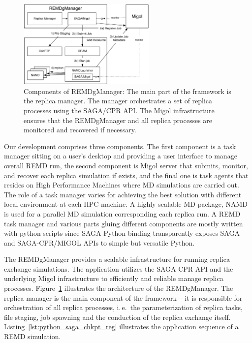 \documentclass[times, 10pt,twocolumn]{article}
\begin{document}
\begin{figure}[htbp]
      \centering
          \includegraphics[width=0.6\textwidth]{REMDgManager-architecture.pdf}
      \caption{Components of REMDgManager: The main part of the framework is the replica manager. The manager orchestrates a set of replica processes using the SAGA/CPR API. The Migol infrastructure ensures that the REMDgManager and all replica processes are monitored and recovered if necessary.}
      \label{fig:REMDgManager-architecture}
\end{figure}



Our development comprises three components. The first component is a
task manager sitting on a user's desktop and providing a user
interface to manage overall REMD run, the second component is Migol
server that submits, monitor, and recover each replica simulation if
exists, and the final one is task agents that resides on High
Performance Machines where MD simulations are carried out.  The role
of a task manager varies for achieving the best solution with
different local environment at each HPC machine.  A highly scalable MD
package, NAMD~\cite{Phillips:2005gd} is used for a parallel MD
simulation corresponding each replica run.  A REMD task manager and
various parts gluing different components are mostly written with
python scripts since SAGA-Python binding transparently exposes SAGA
and SAGA-CPR/MIGOL APIs to simple but versatile Python.

The REMDgManager provides a scalable infrastructure for running
replica exchange simulations.  The application utilizes the SAGA CPR
API and the underlying Migol infrastructure to efficiently and
reliable manage replica
processes. Figure~\ref{fig:REMDgManager-architecture} illustrates the
architecture of the REMDgManager. The replica manager is the main
component of the framework -- it is responsible for orchestration of
all replica processes, i.\,e.\ the parameterization of replica tasks,
file staging, job spawning and the conduction of the replica exchange
itself. Listing~\ref{lst:python_saga_chkpt_reg} illustrates the
application sequence of a REMD simulation.
 
\end{document}
